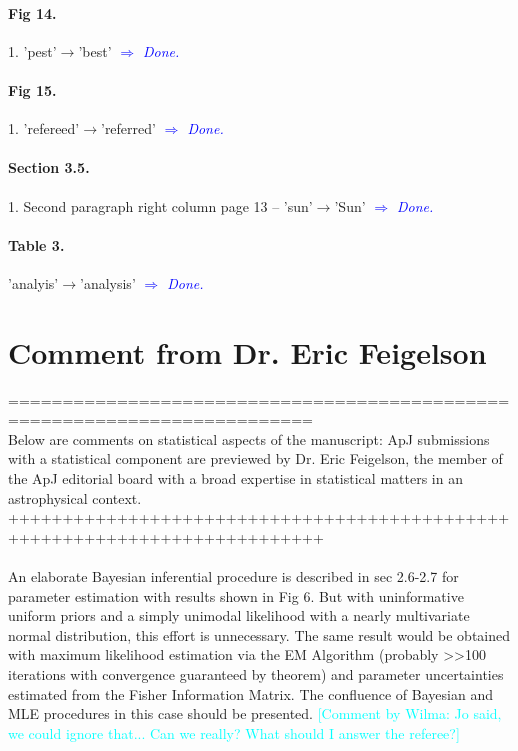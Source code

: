\documentclass[10pt,a4paper]{article}
\newcommand{\HW}[1]{\textcolor{Cyan}{#1}}
\newcommand{\Comment}[1]{\textsl{\textcolor{Blue}{$\Longrightarrow$ {#1}}}}
\begin{document}
\paragraph{Fig 14.} 1. 'pest'$\rightarrow$'best' \Comment{Done.}

\paragraph{Fig 15.} 1. 'refereed'$\rightarrow$'referred'  \Comment{Done.}

\paragraph{Section 3.5.} 1. Second paragraph right column page 13 -- 'sun'$\rightarrow$'Sun' \Comment{Done.}

\paragraph{Table 3.} 'analyis'$\rightarrow$'analysis'  \Comment{Done.}

\section{Comment from Dr. Eric Feigelson}


==========================================================================\\
Below are comments on statistical aspects of the manuscript: ApJ submissions with a
statistical component are previewed by Dr. Eric Feigelson, the member of the ApJ
editorial board with a broad expertise in statistical matters in an astrophysical
context.\\
+++++++++++++++++++++++++++++++++++++++++++++++++++++++++++++++++++++++++++\\\\

An elaborate Bayesian inferential procedure is described in sec 2.6-2.7 for
parameter estimation with results shown in Fig 6. But with uninformative uniform
priors and a simply unimodal likelihood with a nearly multivariate normal
distribution, this effort is unnecessary. The same result would be obtained with
maximum likelihood estimation via the EM Algorithm (probably >>100 iterations with
convergence guaranteed by theorem) and parameter uncertainties estimated from the
Fisher Information Matrix. The confluence of Bayesian and MLE procedures in this
case should be presented. \HW{[Comment by Wilma: Jo said, we could ignore that... Can we really? What should I answer the referee?]}
\end{document}

